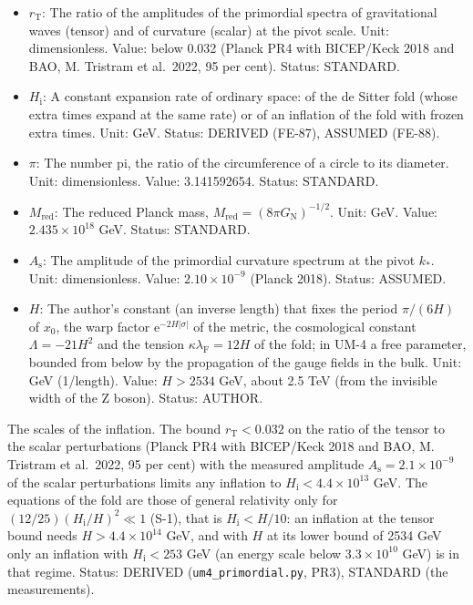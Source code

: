 \documentclass[
  10pt,
]{article}
\providecommand{\tightlist}{%
  \setlength{\itemsep}{0pt}\setlength{\parskip}{0pt}}
\begin{document}
\begin{itemize}
\tightlist
\item
  \(r_{\mathrm{T}}\): The ratio of the amplitudes of the primordial
  spectra of gravitational waves (tensor) and of curvature (scalar) at
  the pivot scale. Unit: dimensionless. Value: below 0.032 (Planck PR4
  with BICEP/Keck 2018 and BAO, M. Tristram et al.~2022, 95 per cent).
  Status: STANDARD.
\item
  \(H_{\mathrm{i}}\): A constant expansion rate of ordinary space: of
  the de Sitter fold (whose extra times expand at the same rate) or of
  an inflation of the fold with frozen extra times. Unit: GeV. Status:
  DERIVED (FE-87), ASSUMED (FE-88).
\item
  \(\pi\): The number pi, the ratio of the circumference of a circle to
  its diameter. Unit: dimensionless. Value: 3.141592654. Status:
  STANDARD.
\item
  \(M_{\mathrm{red}}\): The reduced Planck mass,
  \(M_{\mathrm{red}} = (8\pi G_{\mathrm{N}})^{-1/2}\). Unit: GeV. Value:
  \(2.435\times10^{18}\) GeV. Status: STANDARD.
\item
  \(A_{\mathrm{s}}\): The amplitude of the primordial curvature spectrum
  at the pivot \(k_*\). Unit: dimensionless. Value:
  \(2.10\times10^{-9}\) (Planck 2018). Status: ASSUMED.
\item
  \(H\): The author's constant (an inverse length) that fixes the period
  \(\pi/(6H)\) of \(x_0\), the warp factor
  \(\mathrm{e}^{-2H\lvert\sigma\rvert}\) of the metric, the cosmological
  constant \(\Lambda = -21H^2\) and the tension
  \(\kappa\lambda_{\mathrm{F}} = 12H\) of the fold; in UM-4 a free
  parameter, bounded from below by the propagation of the gauge fields
  in the bulk. Unit: GeV (1/length). Value: \(H > 2534\) GeV, about 2.5
  TeV (from the invisible width of the Z boson). Status: AUTHOR.
\end{itemize}

The scales of the inflation. The bound \(r_{\mathrm{T}} < 0.032\) on the
ratio of the tensor to the scalar perturbations (Planck PR4 with
BICEP/Keck 2018 and BAO, M. Tristram et al.~2022, 95 per cent) with the
measured amplitude \(A_{\mathrm{s}} = 2.1\times10^{-9}\) of the scalar
perturbations limits any inflation to
\(H_{\mathrm{i}} < 4.4\times10^{13}\) GeV. The equations of the fold are
those of general relativity only for
\((12/25)(H_{\mathrm{i}}/H)^2 \ll 1\) (S-1), that is
\(H_{\mathrm{i}} < H/10\): an inflation at the tensor bound needs
\(H > 4.4\times10^{14}\) GeV, and with \(H\) at its lower bound of 2534
GeV only an inflation with \(H_{\mathrm{i}} < 253\) GeV (an energy scale
below \(3.3\times10^{10}\) GeV) is in that regime. Status: DERIVED
(\texttt{um4\_primordial.py}, PR3), STANDARD (the measurements).
\end{document}
